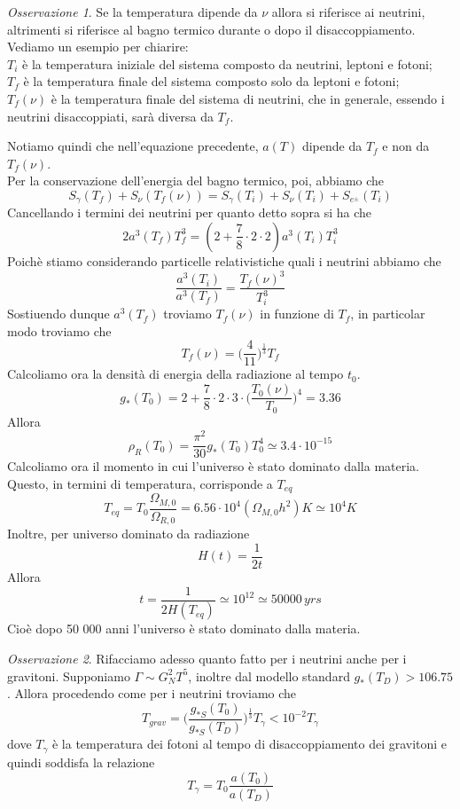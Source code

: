 \documentclass[10pt,a4paper]{article}
\theoremstyle{break}
\theoremstyle{remark}
\newtheorem{oss}{Osservazione}
\theoremstyle{definition}
\begin{document}
\begin{oss}
	Se la temperatura dipende da $\nu$ allora si riferisce ai neutrini, altrimenti si riferisce al bagno termico durante o dopo il disaccoppiamento. Vediamo un esempio per chiarire:\\
	$T_i$ è la temperatura iniziale del sistema composto da neutrini, leptoni e fotoni;\\
	$T_f$ è la temperatura finale del sistema composto solo da leptoni e fotoni;\\
	$T_f(\nu)$ è la temperatura finale del sistema di neutrini, che in generale, essendo i neutrini disaccoppiati, sarà diversa da $T_f$.
\end{oss}
Notiamo quindi che nell'equazione precedente, $a(T)$ dipende da $T_f$ e non da $T_f(\nu)$.\\
Per la conservazione dell'energia del bagno termico, poi, abbiamo che 
\[
S_\gamma(T_f) + S_\nu(T_f(\nu)) = S_\gamma(T_i) + S_\nu(T_i) + S_{e^\pm} (T_i)
\]
Cancellando i termini dei neutrini per quanto detto sopra si ha che
\[
2 a^3(T_f)T_f^3 = (2 + \frac78 \cdot 2 \cdot 2)a^3(T_i) T_i^3
\]
Poichè stiamo considerando particelle relativistiche quali i neutrini abbiamo che 
\[
\frac{a^3(T_i)}{a^3(T_f)} = \frac{T_f(\nu)^3}{T_i^3}
\]
Sostiuendo dunque $a^3(T_f)$ troviamo $T_f(\nu)$ in funzione di $T_f$, in particolar modo troviamo che
\[
T_f(\nu) = \bigg(\frac{4}{11}\bigg)^{\frac13} T_f
\]
Calcoliamo ora la densità di energia della radiazione al tempo $t_0$.
\[
g_*(T_0) = 2+ \frac78 \cdot 2 \cdot 3 \cdot \bigg(\frac{T_0(\nu)}{T_0}\bigg)^4 = 3.36
\]
Allora
\[
\rho_R(T_0) = \frac{\pi^2}{30}g_*(T_0)T_0^4 \simeq 3.4 \cdot 10^{-15}
\]
Calcoliamo ora il momento in cui l'universo è stato dominato dalla materia.
Questo, in termini di temperatura, corrisponde a $T_{eq}$
\[
T_{eq} = T_0 \frac{\Omega_{M, 0}}{\Omega_{R, 0}} = 6.56 \cdot 10^4 (\Omega_{M, 0} h^2) K \simeq 10^4 K 
\]
Inoltre, per universo dominato da radiazione
\[
H(t) = \frac{1}{2 t}
\]
Allora
\[
t = \frac{1}{2 H(T_{eq})} \simeq 10^{12} \simeq 50000\,yrs
\]
Cioè dopo 50 000 anni l'universo è stato dominato dalla materia.
\begin{oss}
	Rifacciamo adesso quanto fatto per i neutrini anche per i gravitoni. Supponiamo $\Gamma \sim G_N^2 T^5$, inoltre dal modello standard $g_*(T_D) > 106.75$. Allora procedendo come per i neutrini troviamo che
	\[
	T_{grav} = \bigg(\frac{g_{*S}(T_0)}{g_{*S}(T_D)}\bigg)^\frac13 T_\gamma < 10^{-2} T_\gamma
	\]
	dove $T_\gamma$ è la temperatura dei fotoni al tempo di disaccoppiamento dei gravitoni e quindi soddisfa la relazione
	\[
	T_\gamma = T_0 \frac{a(T_0)}{a(T_D)}
	\]
\end{oss}
\end{document}
